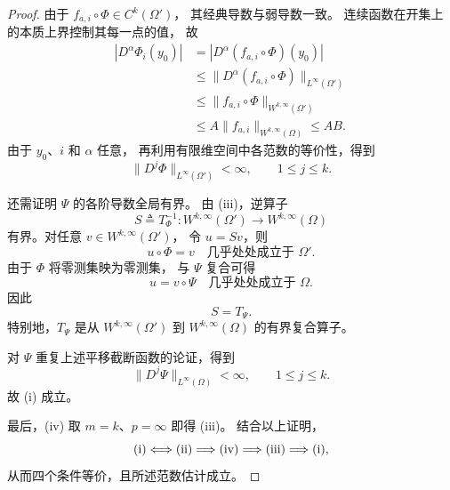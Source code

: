 \documentclass[../../main.tex]{subfiles}%
\begin{document}
\begin{proof}
由于 $f_{a,i}\circ\Phi\in C^k(\Omega')$，
其经典导数与弱导数一致。
连续函数在开集上的本质上界控制其每一点的值，
故
\begin{align*}
|D^\alpha\Phi_i(y_0)|
&=
|D^\alpha(f_{a,i}\circ\Phi)(y_0)|\\
&\leqslant
\|D^\alpha(f_{a,i}\circ\Phi)\|_{L^\infty(\Omega')}\\
&\leqslant
\|f_{a,i}\circ\Phi\|_{W^{k,\infty}(\Omega')}\\
&\leqslant
A\|f_{a,i}\|_{W^{k,\infty}(\Omega)}
\leqslant AB.
\end{align*}
由于 $y_0$、$i$ 和 $\alpha$ 任意，
再利用有限维空间中各范数的等价性，得到
\[
\|D^j\Phi\|_{L^\infty(\Omega')}<\infty,
\qquad 1\leqslant j\leqslant k.
\]

还需证明 $\Psi$ 的各阶导数全局有界。
由 \textup{(iii)}，逆算子
\[
S\triangleq T_\Phi^{-1}:
W^{k,\infty}(\Omega')
\longrightarrow W^{k,\infty}(\Omega)
\]
有界。对任意 $v\in W^{k,\infty}(\Omega')$，
令 $u=Sv$，则
\[
u\circ\Phi=v
\quad\text{几乎处处成立于 }\Omega'.
\]
由于 $\Phi$ 将零测集映为零测集，
与 $\Psi$ 复合可得
\[
u=v\circ\Psi
\quad\text{几乎处处成立于 }\Omega.
\]
因此
\[
S=T_\Psi.
\]
特别地，$T_\Psi$ 是从
$W^{k,\infty}(\Omega')$ 到 $W^{k,\infty}(\Omega)$
的有界复合算子。

对 $\Psi$ 重复上述平移截断函数的论证，得到
\[
\|D^j\Psi\|_{L^\infty(\Omega)}<\infty,
\qquad 1\leqslant j\leqslant k.
\]
故 \textup{(i)} 成立。

最后，\textup{(iv)} 取 $m=k$、$p=\infty$
即得 \textup{(iii)}。
结合以上证明，
\[
\textup{(i)}
\Longleftrightarrow
\textup{(ii)}
\Longrightarrow
\textup{(iv)}
\Longrightarrow
\textup{(iii)}
\Longrightarrow
\textup{(i)},
\]
从而四个条件等价，且所述范数估计成立。
\end{proof}
\end{document}
